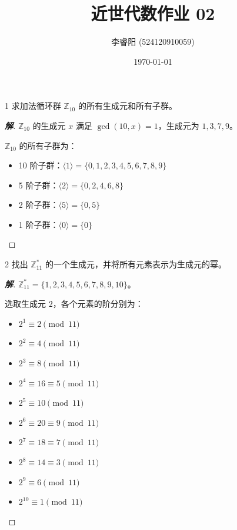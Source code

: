 \documentclass[12pt, a4paper]{article}
\title{近世代数作业 02}
\author{李睿阳 (524120910059)}
\date{\today}
\newenvironment{solution}{
    \begin{proof}[\textbf{解}]
}{
    \end{proof}
}
\begin{document}
\maketitle

\begin{problem}{1}
    求加法循环群 $\mathbb{Z}_{10}$ 的所有生成元和所有子群。
\end{problem}
\begin{solution}
    $\mathbb{Z}_{10}$ 的生成元 $x$ 满足 $\gcd(10,x)=1$，生成元为 $1, 3, 7, 9$。

    $\mathbb{Z}_{10}$ 的所有子群为：
    \begin{itemize}
        \item 10 阶子群：$\langle 1 \rangle = \{0, 1, 2, 3, 4, 5, 6, 7, 8, 9\}$
        \item 5 阶子群：$\langle 2 \rangle = \{0, 2, 4, 6, 8\}$
        \item 2 阶子群：$\langle 5 \rangle = \{0, 5\}$
        \item 1 阶子群：$\langle 0 \rangle = \{0\}$
    \end{itemize}
\end{solution}

\begin{problem}{2}
    找出 $\mathbb{Z}_{11}^*$ 的一个生成元，并将所有元素表示为生成元的幂。
\end{problem}

\begin{solution}
    $\mathbb{Z}_{11}^* = \{1, 2, 3, 4, 5, 6, 7, 8, 9, 10\}$。

    选取生成元 $2$，各个元素的阶分别为：
    \begin{itemize}
        \item $2^1 \equiv 2 \pmod{11}$
        \item $2^2 \equiv 4 \pmod{11}$
        \item $2^3 \equiv 8 \pmod{11}$
        \item $2^4 \equiv 16 \equiv 5 \pmod{11}$
        \item $2^5 \equiv 10 \pmod{11}$
        \item $2^6 \equiv 20 \equiv 9 \pmod{11}$
        \item $2^7 \equiv 18 \equiv 7 \pmod{11}$
        \item $2^8 \equiv 14 \equiv 3 \pmod{11}$
        \item $2^9 \equiv 6 \pmod{11}$
        \item $2^{10} \equiv 1 \pmod{11}$
    \end{itemize}
\end{solution}
\end{document}
